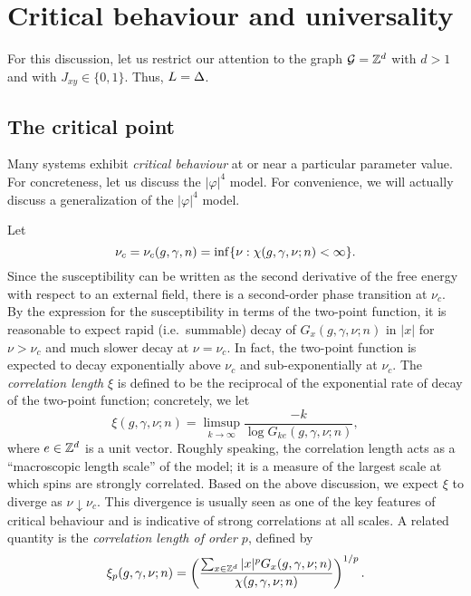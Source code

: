 
\section{Critical behaviour and universality}

For this discussion, let us restrict our attention to the graph $\mathcal{G} = { {{\mathbb Z}}^d }$
with $d > 1$ and with $J_{xy} \in \{ 0, 1 \}$. Thus, $L = \Delta$.

\subsection{The critical point}

Many systems exhibit \emph{critical behaviour} at or near a particular parameter value.
For concreteness, let us discuss the $|\varphi|^4$ model. For convenience, we will
actually discuss a generalization of the $|\varphi|^4$ model. 

Let
\begin{equation}
\nu_c = \nu_c(g, \gamma, n) = \inf \{ \nu : \chi(g, \gamma, \nu; n) < \infty \}.
\end{equation}
Since the susceptibility can be written as the second derivative of the free energy
with respect to an external field, there is a second-order phase transition at $\nu_c$.
By the expression for the susceptibility in terms of the two-point function, it is
reasonable to expect rapid (i.e.\ summable) decay of $G_x(g, \gamma, \nu; n)$ in $|x|$ for
$\nu > \nu_c$ and much slower decay at $\nu = \nu_c$. In fact, the two-point function
is expected to decay exponentially above $\nu_c$ and sub-exponentially at $\nu_c$.
The \emph{correlation length} $\xi$ is defined to be the reciprocal of the exponential
rate of decay of the two-point function; concretely, we let
\begin{equation}
\xi(g, \gamma, \nu; n) = \limsup_{k\to\infty} \frac{-k}{\log G_{ke}(g, \gamma, \nu; n)},
\end{equation}
where $e \in { {{\mathbb Z}}^d }$ is a unit vector. Roughly speaking, the correlation length acts as
a ``macroscopic length scale'' of the model; it is a measure of the largest scale at
which spins are strongly correlated.
Based on the above discussion, we expect $\xi$
to diverge as $\nu\downarrow\nu_c$. This divergence is usually seen as one of the
key features of critical behaviour and is indicative of strong correlations at all
scales. A related quantity is the \emph{correlation length of order $p$}, defined by
\begin{equation}
\xi_p(g, \gamma, \nu; n)
	=
\left(\frac{\sum_{x\in{ {{\mathbb Z}}^d }} |x|^p G_x(g, \gamma, \nu; n)}{\chi(g, \gamma, \nu; n)}\right)^{1/p}.
\end{equation}


